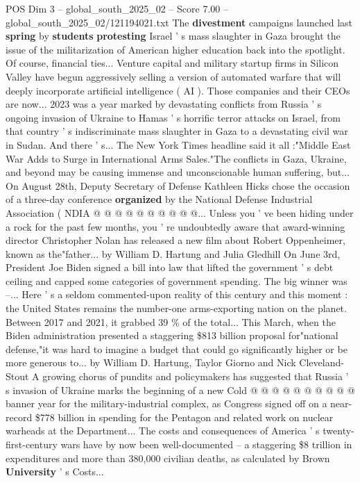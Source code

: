 \begin{textsample}{POS Dim 3 – global\_south\_2025\_02 – Score 7.00 – global\_south\_2025\_02/121194021.txt}  \label{ex:f3_pos_411}
The \textbf{divestment} campaigns launched last \textbf{spring} by \textbf{students} \textbf{protesting} Israel ' s mass slaughter in Gaza brought the issue of the militarization of American higher education back into the spotlight.
Of course, financial ties...
Venture capital and military startup firms in Silicon Valley have begun aggressively selling a version of automated warfare that will deeply incorporate artificial intelligence ( AI ).
Those companies and their CEOs are now... 2023 was a year marked by devastating conflicts from Russia ' s ongoing invasion of Ukraine to Hamas ' s horrific terror attacks on Israel, from that country ' s indiscriminate mass slaughter in Gaza to a devastating civil war in Sudan.
And there ' s...
The New York Times headline said it all :"Middle East War Adds to Surge in International Arms Sales."The conflicts in Gaza, Ukraine, and beyond may be causing immense and unconscionable human suffering, but...
On August 28th, Deputy Secretary of Defense Kathleen Hicks chose the occasion of a three-day conference \textbf{organized} by the National Defense Industrial Association ( NDIA @ @ @ @ @ @ @ @ @ @...
Unless you ' ve been hiding under a rock for the past few months, you ' re undoubtedly aware that award-winning director Christopher Nolan has released a new film about Robert Oppenheimer, known as the"father... by William D.
Hartung and Julia Gledhill On June 3rd, President Joe Biden signed a bill into law that lifted the government ' s debt ceiling and capped some categories of government spending.
The big winner was --...
Here ' s a seldom commented-upon reality of this century and this moment : the United States remains the number-one arms-exporting nation on the planet.
Between 2017 and 2021, it grabbed 39 \% of the total...
This March, when the Biden administration presented a staggering \$813 billion proposal for"national defense,"it was hard to imagine a budget that could go significantly higher or be more generous to... by William D.
Hartung, Taylor Giorno and Nick Cleveland-Stout A growing chorus of pundits and policymakers has suggested that Russia ' s invasion of Ukraine marks the beginning of a new Cold @ @ @ @ @ @ @ @ @ @ banner year for the military-industrial complex, as Congress signed off on a near-record \$778 billion in spending for the Pentagon and related work on nuclear warheads at the Department...
The costs and consequences of America ' s twenty-first-century wars have by now been well-documented -- a staggering \$8 trillion in expenditures and more than 380,000 civilian deaths, as calculated by Brown \textbf{University} ' s Costs...

\end{textsample}
